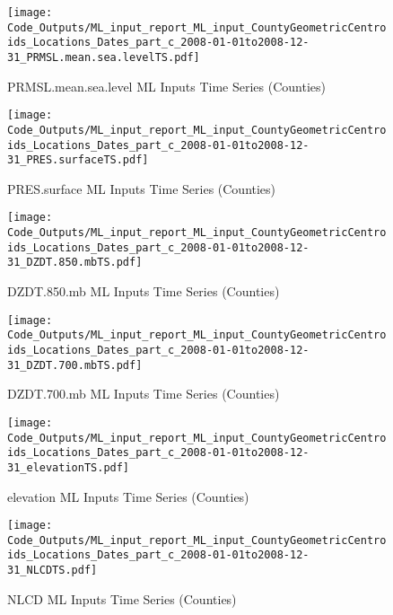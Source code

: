 \begin{figure} 
\centering  
\texttt{[image: Code\_Outputs/ML\_input\_report\_ML\_input\_CountyGeometricCentroids\_Locations\_Dates\_part\_c\_2008-01-01to2008-12-31\_PRMSL.mean.sea.levelTS.pdf]} 
\caption{\label{fig:ML_input_report_ML_input_CountyGeometricCentroids_Locations_Dates_part_c_2008-01-01to2008-12-31PRMSL.mean.sea.levelTS}PRMSL.mean.sea.level ML Inputs Time Series (Counties)} 
\end{figure} 
 

\begin{figure} 
\centering  
\texttt{[image: Code\_Outputs/ML\_input\_report\_ML\_input\_CountyGeometricCentroids\_Locations\_Dates\_part\_c\_2008-01-01to2008-12-31\_PRES.surfaceTS.pdf]} 
\caption{\label{fig:ML_input_report_ML_input_CountyGeometricCentroids_Locations_Dates_part_c_2008-01-01to2008-12-31PRES.surfaceTS}PRES.surface ML Inputs Time Series (Counties)} 
\end{figure} 
 

\begin{figure} 
\centering  
\texttt{[image: Code\_Outputs/ML\_input\_report\_ML\_input\_CountyGeometricCentroids\_Locations\_Dates\_part\_c\_2008-01-01to2008-12-31\_DZDT.850.mbTS.pdf]} 
\caption{\label{fig:ML_input_report_ML_input_CountyGeometricCentroids_Locations_Dates_part_c_2008-01-01to2008-12-31DZDT.850.mbTS}DZDT.850.mb ML Inputs Time Series (Counties)} 
\end{figure} 
 

\begin{figure} 
\centering  
\texttt{[image: Code\_Outputs/ML\_input\_report\_ML\_input\_CountyGeometricCentroids\_Locations\_Dates\_part\_c\_2008-01-01to2008-12-31\_DZDT.700.mbTS.pdf]} 
\caption{\label{fig:ML_input_report_ML_input_CountyGeometricCentroids_Locations_Dates_part_c_2008-01-01to2008-12-31DZDT.700.mbTS}DZDT.700.mb ML Inputs Time Series (Counties)} 
\end{figure} 
 

\begin{figure} 
\centering  
\texttt{[image: Code\_Outputs/ML\_input\_report\_ML\_input\_CountyGeometricCentroids\_Locations\_Dates\_part\_c\_2008-01-01to2008-12-31\_elevationTS.pdf]} 
\caption{\label{fig:ML_input_report_ML_input_CountyGeometricCentroids_Locations_Dates_part_c_2008-01-01to2008-12-31elevationTS}elevation ML Inputs Time Series (Counties)} 
\end{figure} 
 

\begin{figure} 
\centering  
\texttt{[image: Code\_Outputs/ML\_input\_report\_ML\_input\_CountyGeometricCentroids\_Locations\_Dates\_part\_c\_2008-01-01to2008-12-31\_NLCDTS.pdf]} 
\caption{\label{fig:ML_input_report_ML_input_CountyGeometricCentroids_Locations_Dates_part_c_2008-01-01to2008-12-31NLCDTS}NLCD ML Inputs Time Series (Counties)} 
\end{figure} 
 

